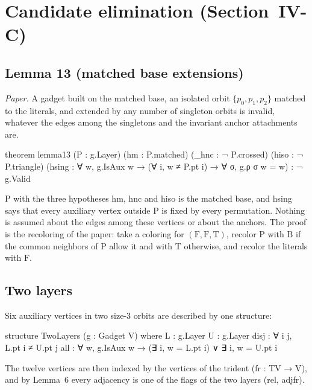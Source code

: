 \documentclass[11pt,a4paper]{article}
\newcommand{\leanus}{\textunderscore\allowbreak}
\newcommand{\lean}[1]{{\ttfamily\let\_\leanus #1}}
\newcommand{\T}{\mathrm{T}}
\newcommand{\F}{\mathrm{F}}
\newcommand{\B}{\mathrm{B}}
\begin{document}
\section{Candidate elimination (Section~IV-C)}\label{sec:elimination}

\subsection{Lemma 13 (matched base extensions)}\label{sec:lemma13}
\emph{Paper.} A gadget built on the matched base, an isolated orbit
$\{p_0,p_1,p_2\}$ matched to the literals, and extended by any number of
singleton orbits is invalid, whatever the edges among the singletons and the
invariant anchor attachments are.
\begin{code}
theorem lemma13 (P : g.Layer) (hm : P.matched) (_hnc : ¬ P.crossed) (hiso : ¬ P.triangle)
    (hsing : ∀ w, g.IsAux w → (∀ i, w ≠ P.pt i) → ∀ σ, g.ρ σ w = w) : ¬ g.Valid
\end{code}
\lean{P} with the three hypotheses \lean{hm}, \lean{\_hnc} and \lean{hiso}
is the matched base, and \lean{hsing} says that every auxiliary vertex
outside \lean{P} is fixed by every permutation. Nothing is assumed about the
edges among these vertices or about the anchors. The proof is the recoloring
of the paper: take a coloring for $(\F,\F,\T)$, recolor \lean{P} with $\B$
if the common neighbors of \lean{P} allow it and with $\T$ otherwise, and
recolor the literals with $\F$.

\subsection{Two layers}
Six auxiliary vertices in two size-3 orbits are described by one structure:
\begin{code}
structure TwoLayers (g : Gadget V) where
  L : g.Layer
  U : g.Layer
  disj : ∀ i j, L.pt i ≠ U.pt j
  all : ∀ w, g.IsAux w → (∃ i, w = L.pt i) ∨ ∃ i, w = U.pt i
\end{code}
The twelve vertices are then indexed by the vertices of the trident
(\lean{fr : TV → V}), and by Lemma~6 every adjacency is one of the flags of
the two layers (\lean{rel}, \lean{adj\_fr}).
\end{document}
